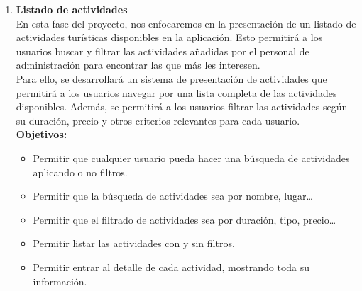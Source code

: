 \begin{enumerate}[label=\bfseries{Fase \arabic*.},leftmargin=*]
	      {\bfseries Objetivos:}
	      \begin{itemize}
		      \item Permitir al personal de administración incluir nuevas actividades.
		      \item Permitir al personal de administración añadir eventos de actividades existentes.
		      \item Permitir al personal de administración modificar o eliminar eventos existentes.
		      \item Permitir al personal de administración modificar y/o actualizar la información de las actividades.
		      \item Permitir al personal de administración eliminar o cerrar temporalmente actividades.
	      \end{itemize}
	\item {\bfseries Listado de actividades}\\[1ex] En esta fase del proyecto, nos enfocaremos en la presentación de un listado de actividades turísticas disponibles en la aplicación. Esto permitirá a los usuarios buscar y filtrar las actividades añadidas por el personal de administración para encontrar las que más les interesen.\\[1ex]Para ello, se desarrollará un sistema de presentación de actividades que permitirá a los usuarios navegar por una lista completa de las actividades disponibles. Además, se permitirá a los usuarios filtrar las actividades según su duración, precio y otros criterios relevantes para cada usuario.\\[1ex]
	      {\bfseries Objetivos:}
	      \begin{itemize}
		      \item Permitir que cualquier usuario pueda hacer una búsqueda de 	actividades aplicando o no filtros.
		      \item Permitir que la búsqueda de actividades sea por nombre, lugar…
		      \item Permitir que el filtrado de actividades sea por duración, tipo, precio…
		      \item Permitir listar las actividades con y sin filtros.
		      \item Permitir entrar al detalle de cada actividad, mostrando toda su información.
	      \end{itemize}

\end{enumerate}
